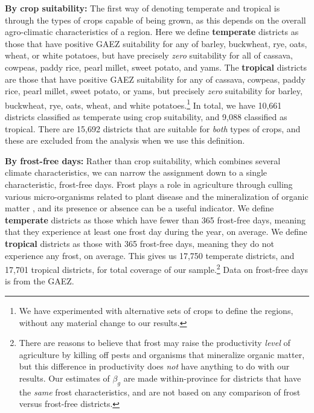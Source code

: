 \documentclass[11pt]{article}
\begin{document}
\vspace{.5cm}\noindent\textbf{By crop suitability:} The first way of denoting temperate and tropical is through the types of crops capable of being grown, as this depends on the overall agro-climatic characteristics of a region. Here we define \textbf{temperate} districts as those that have positive GAEZ suitability for any of barley, buckwheat, rye, oats, wheat, or white potatoes, but have precisely \textit{zero} suitability for all of cassava, cowpeas, paddy rice, pearl millet, sweet potato, and yams. The \textbf{tropical} districts are those that have positive GAEZ suitability for any of cassava, cowpeas, paddy rice, pearl millet, sweet potato, or yams, but precisely \textit{zero} suitability for barley, buckwheat, rye, oats, wheat, and white potatoes.\footnote{We have experimented with alternative sets of crops to define the regions, without any material change to our results.} In total, we have 10,661 districts classified as temperate using crop suitability, and 9,088 classified as tropical. There are 15,692 districts that are suitable for \textit{both} types of crops, and these are excluded from the analysis when we use this definition.

\vspace{.5cm}\noindent\textbf{By frost-free days:} Rather than crop suitability, which combines several climate characteristics, we can narrow the assignment down to a single characteristic, frost-free days. Frost plays a role in agriculture through culling various micro-organisms related to plant disease and the mineralization of organic matter \citep{Masters:2001kl}, and its presence or absence can be a useful indicator. We define \textbf{temperate} districts as those which have fewer than 365 frost-free days, meaning that they experience at least one frost day during the year, on average. We define \textbf{tropical} districts as those with 365 frost-free days, meaning they do not experience any frost, on average. This gives us 17,750 temperate districts, and 17,701 tropical districts, for total coverage of our sample.\footnote{There are reasons to believe that frost may raise the productivity \textit{level} of agriculture by killing off pests and organisms that mineralize organic matter, but this difference in productivity does \textit{not} have anything to do with our results. Our estimates of $\beta_g$ are made within-province for districts that have the \textit{same} frost characteristics, and are not based on any comparison of frost versus frost-free districts.} Data on frost-free days is from the GAEZ.
\end{document}
